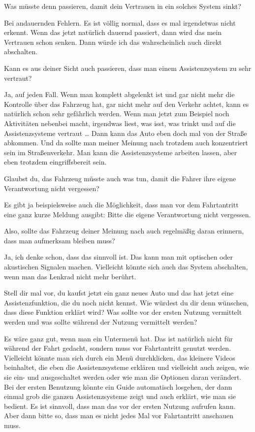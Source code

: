 \interviewerin
Was müsste denn passieren, damit dein Vertrauen in ein solches System
sinkt?

Bei andauernden Fehlern. Es ist völlig normal, dass es mal irgendetwas
nicht erkennt. Wenn das jetzt natürlich dauernd passiert, dann wird das
mein Vertrauen schon senken. Dann würde ich das wahrscheinlich auch
direkt abschalten.

\interviewerin
Kann es aus deiner Sicht auch passieren, dass man einem Assistenzsystem
zu sehr vertraut?

Ja, auf jeden Fall. Wenn man komplett abgelenkt ist und gar nicht mehr
die Kontrolle über das Fahrzeug hat, gar nicht mehr auf den Verkehr
achtet, kann es natürlich schon sehr gefährlich werden. Wenn man jetzt
zum Beispiel noch Aktivitäten nebenbei macht, irgendwas liest, was isst,
was trinkt und auf die Assistenzsysteme vertraut … Dann kann das Auto
eben doch mal von der Straße abkommen. Und da sollte man meiner Meinung
nach trotzdem auch konzentriert sein im Straßenverkehr. Man kann die
Assistenzsysteme arbeiten lassen, aber eben trotzdem eingriffsbereit
sein.

\interviewerin
Glaubst du, das Fahrzeug müsste auch was tun, damit die Fahrer ihre
eigene Verantwortung nicht vergessen?

Es gibt ja beispielsweise auch die Möglichkeit, dass man vor dem
Fahrtantritt eine ganz kurze Meldung ausgibt: Bitte die eigene
Verantwortung nicht vergessen.

\interviewerin
Also, sollte das Fahrzeug deiner Meinung nach auch regelmäßig daran
erinnern, dass man aufmerksam bleiben muss?

Ja, ich denke schon, dass das sinnvoll ist. Das kann man mit optischen
oder akustischen Signalen machen. Vielleicht könnte sich auch das System
abschalten, wenn man das Lenkrad nicht mehr berührt.

\interviewerin
Stell dir mal vor, du kaufst jetzt ein ganz neues Auto und das hat jetzt
eine Assistenzfunktion, die du noch nicht kennst. Wie würdest du dir
denn wünschen, dass diese Funktion erklärt wird? Was sollte vor der
ersten Nutzung vermittelt werden und was sollte während der Nutzung
vermittelt werden?

Es wäre ganz gut, wenn man ein Untermenü hat. Das ist natürlich nicht
für während der Fahrt gedacht, sondern muss vor Fahrtantritt genutzt
werden. Vielleicht könnte man sich durch ein Menü durchklicken, das
kleinere Videos beinhaltet, die eben die Assistenzsysteme erklären und
vielleicht auch zeigen, wie sie ein- und ausgeschaltet werden oder wie
man die Optionen daran verändert. Bei der ersten Benutzung könnte ein
Guide automatisch losgehen, der dann einmal grob die ganzen
Assistenzsysteme zeigt und auch erklärt, wie man sie bedient. Es ist
sinnvoll, dass man das vor der ersten Nutzung aufrufen kann. Aber dann
bitte so, dass man es nicht jedes Mal vor Fahrtantritt anschauen muss.

